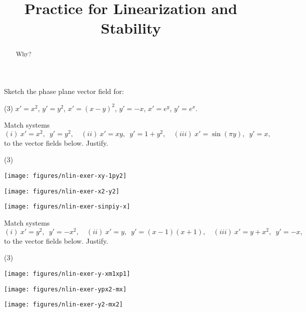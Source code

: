 \documentclass{ximera}
\title{Practice for Linearization and Stability}
\begin{document}
\begin{abstract}
Why?
\end{abstract}
\maketitle


\begin{exercise}
    Sketch the phase plane vector field for:
    \begin{tasks}(3)
        \task $x'=x^2$, \enspace $y'=y^2$,
        \task $x'=(x-y)^2$, \enspace $y'=-x$,
        \task $x'=e^y$, \enspace $y'=e^x$.
    \end{tasks}
\end{exercise}

\begin{exercise}
    Match systems
    \begin{equation*}
        (i)\  x'=x^2, \enspace y'=y^2, \quad (ii)\  x'=xy, \enspace y'=1+y^2, \quad (iii)\  x'=\sin(\pi y), \enspace y'=x,
    \end{equation*}
    to the vector fields below.  Justify.
    \begin{tasks}(3)
        \task \parbox[c]{1.75in}{\texttt{[image: figures/nlin-exer-xy-1py2]}}
        \task \parbox[c]{1.75in}{\texttt{[image: figures/nlin-exer-x2-y2]}}
        \task \parbox[c]{1.75in}{\texttt{[image: figures/nlin-exer-sinpiy-x]}}
    \end{tasks}
\end{exercise}

\begin{exercise}%
    Match systems
    \begin{equation*}
        (i)\  x'=y^2, \enspace y'=-x^2, \quad (ii)\  x'=y, \enspace y'=(x-1)(x+1), \quad (iii)\  x'=y+x^2, \enspace y'=-x,
    \end{equation*}
    to the vector fields below.  Justify.
    \begin{tasks}(3)
        \task \parbox[c]{1.75in}{\texttt{[image: figures/nlin-exer-y-xm1xp1]}}
        \task \parbox[c]{1.75in}{\texttt{[image: figures/nlin-exer-ypx2-mx]}}
        \task \parbox[c]{1.75in}{\texttt{[image: figures/nlin-exer-y2-mx2]}}
    \end{tasks}
\end{exercise}
\end{document}
